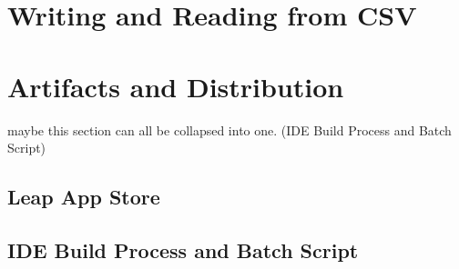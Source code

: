 \section{Writing and Reading from CSV}


\section{Artifacts and Distribution}

maybe this section can all be collapsed into one. (IDE Build Process and Batch Script)

\subsection{Leap App Store}

\subsection{IDE Build Process and Batch Script}


